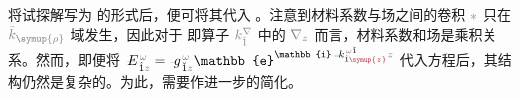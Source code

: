 将试探解写为  的形式后，便可将其代入 。注意到材料系数与场之间的卷积 $\mathcolor{gray}{*}$ 只在 $\mathcolor{gray}{\bar{k}_{\symup{\rho}}}$ 域发生，因此对于  即算子 $\mathcolor{gray}{k^\nabla_{\check{1}}}$ 中的 $\mathcolor{gray}{\nabla_z}$ 而言，材料系数和场是乘积关系。然而，即便将 $\Xint{\mathcolor{gray}{-}}{25}{E}^{\;\!\mathcolor{gray}{\omega}}_{\;\! \hat{1} \mathcolor{gray}{z}} = \Xint{{}^{}_{\mathcolor{gray}{-}}}{10}{g}^{\;\!\mathcolor{gray}{\omega}}_{\;\! \breve{1} \mathcolor{gray}{z}} \mathbb{e}^{\mathbb{i} \Xint{\begin{smallmatrix} ~ \\ {}^{}_{\mathcolor{gray}{-}} \\ ~ \end{smallmatrix}}{15}{k}_{\hat{1} \textcolor{Maroon}{\symup{z}}}^{\;\! \mathcolor{gray}{\omega} \breve{1}} \mathcolor{gray}{z}}$ 代入方程后，其结构仍然是复杂的。为此，需要作进一步的简化。


